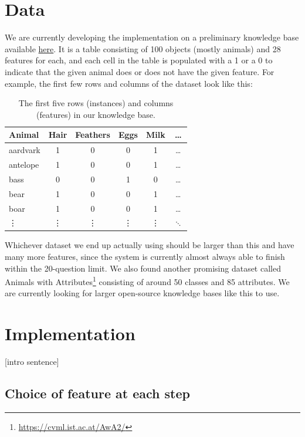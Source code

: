 \documentclass[11pt,a4paper]{article}
\begin{document}
\section{Data}
We are currently developing the implementation on a preliminary knowledge base available \href{https://github.com/drdevinhopkins/20_Questions/blob/master/knowledge_base.csv}{here}.
It is a table consisting of 100 objects (mostly animals) and 28 features for each, and each cell in the table is populated with a 1 or a 0 to indicate that the given animal does or does not have the given feature.
For example, the first few rows and columns of the dataset look like this:

\begin{table}
\begin{center}
	\begin{tabular}{lccccc}
		\toprule
		Animal & Hair & Feathers & Eggs & Milk & \ldots \\ \midrule
		aardvark & 1 & 0 & 0 & 1 & \ldots \\
		antelope & 1 & 0 & 0 & 1 & \ldots \\
		bass & 0 & 0 & 1 & 0 & \ldots \\
		bear & 1 & 0 & 0 & 1 & \ldots \\
		boar & 1 & 0 & 0 & 1 & \ldots \\
		\vdots & \vdots & \vdots & \vdots & \vdots & $\ddots$ \\
		\bottomrule
	\end{tabular}
\end{center}
\caption{The first five rows (instances) and columns (features) in our knowledge base.}
\label{tab:knowledge-base}
\end{table}

Whichever dataset we end up actually using should be larger than this and have many more features, since the system is currently almost always able to finish within the 20-question limit.
We also found another promising dataset called Animals with Attributes\footnote{\url{https://cvml.ist.ac.at/AwA2/}} consisting of around 50 classes and 85 attributes. 
We are currently looking for larger open-source knowledge bases like this to use.

\section{Implementation}

[intro sentence]

\subsection{Choice of feature at each step}
\end{document}
